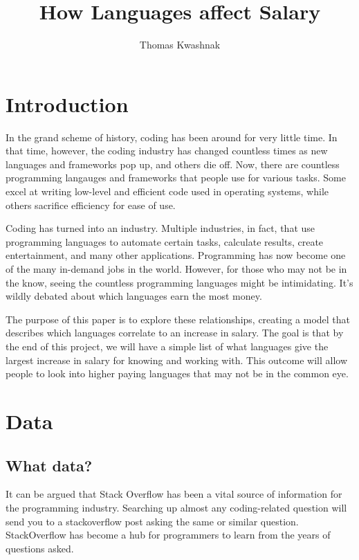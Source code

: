 \documentclass{report}
\title{How Languages affect Salary}
\author{Thomas Kwashnak}
\begin{document}
\maketitle

\tableofcontents

\newpage

\chapter{Introduction}
In the grand scheme of history, coding has been around for very little time. In that time, however, the coding industry has changed countless times as new languages and frameworks pop up, and others die off. Now, there are countless programming langauges and frameworks that people use for various tasks. Some excel at writing low-level and efficient code used in operating systems, while others sacrifice efficiency for ease of use.

Coding has turned into an industry. Multiple industries, in fact, that use programming languages to automate certain tasks, calculate results, create entertainment, and many other applications. Programming has now become one of the many in-demand jobs in the world. However, for those who may not be in the know, seeing the countless programming languages might be intimidating. It's wildly debated about which languages earn the most money.

The purpose of this paper is to explore these relationships, creating a model that describes which languages correlate to an increase in salary. The goal is that by the end of this project, we will have a simple list of what languages give the largest increase in salary for knowing and working with. This outcome will allow people to look into higher paying languages that may not be in the common eye.

\chapter{Data}

\section{What data?}

It can be argued that Stack Overflow has been a vital source of information for the programming industry. Searching up almost any coding-related question will send you to a stackoverflow post asking the same or similar question. StackOverflow has become a hub for programmers to learn from the years of questions asked.
\end{document}
